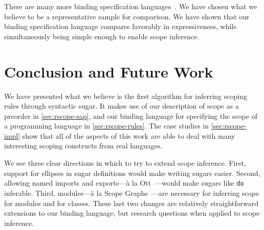 There are many more binding specification
languages~\cite{aczel-church-rosser,pottier-caml,nabl}.
We have chosen what we believe to be a representative sample for
comparison. We have shown that our binding specification language
compares favorably in expressiveness, while simultaneously being
simple enough to enable scope inference.

\section{Conclusion and Future Work}
We have presented what we believe is the first algorithm for
inferring scoping rules through syntactic sugar. It makes use
of our description of scope as a preorder in
\cref{sec:rscope-sap}, and our binding language for specifying the
scope of a programming language in \cref{sec:rscope-rules}. The case studies
in \cref{sec:rscope-impl} show that all of the aspects of this work
are able to deal with many interesting scoping constructs from real
languages.

We see three clear directions in which to try to extend scope
inference. First, support for ellipses in sugar definitions would make
writing sugars easier. Second, allowing named imports and exports---\`a
la Ott~\cite{sewell-ott-jfp}---would make sugars like \texttt{do}
inferable.  Third, modules---\`a la Scope Graphs~\cite{neron-scope}---are
necessary for inferring scope for modules and for classes. These last
two changes are relatively straightforward extensions to our binding
language, but research questions when applied to scope inference.



\newpage

